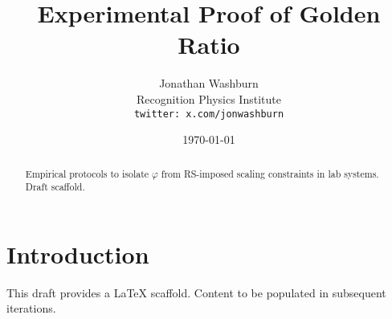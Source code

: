 \documentclass[11pt,letterpaper]{article}
\title{Experimental Proof of Golden Ratio}
\author{Jonathan Washburn\\Recognition Physics Institute\\\texttt{twitter: x.com/jonwashburn}}
\date{\today}
\begin{document}
\maketitle
\begin{abstract}
Empirical protocols to isolate $\varphi$ from RS-imposed scaling constraints in lab systems. Draft scaffold.
\end{abstract}
\section{Introduction}
This draft provides a LaTeX scaffold. Content to be populated in subsequent iterations.
\end{document}
